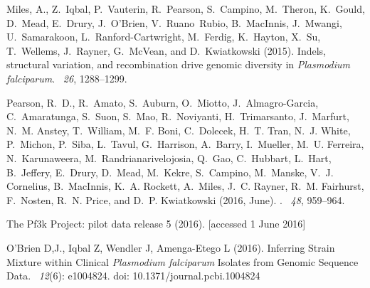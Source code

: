 \documentclass{bioinfo}
\begin{document}
\begin{thebibliography}{}
Miles, A., Z.~Iqbal, P.~Vauterin, R.~Pearson, S.~Campino, M.~Theron, K.~Gould,
  D.~Mead, E.~Drury, J.~O{\textquoteright}Brien, V.~Ruano~Rubio, B.~MacInnis,
  J.~Mwangi, U.~Samarakoon, L.~Ranford-Cartwright, M.~Ferdig, K.~Hayton, X.~Su,
  T.~Wellems, J.~Rayner, G.~McVean, and D.~Kwiatkowski (2015).
\newblock Indels, structural variation, and recombination drive genomic diversity in {\it Plasmodium falciparum}.
~{\em26\/}, 1288--1299.

Pearson, R.~D., R.~Amato, S.~Auburn, O.~Miotto, J.~Almagro-Garcia,
  C.~Amaratunga, S.~Suon, S.~Mao, R.~Noviyanti, H.~Trimarsanto, J.~Marfurt,
  N.~M. Anstey, T.~William, M.~F. Boni, C.~Dolecek, H.~T. Tran, N.~J. White,
  P.~Michon, P.~Siba, L.~Tavul, G.~Harrison, A.~Barry, I.~Mueller, M.~U.
  Ferreira, N.~Karunaweera, M.~Randrianarivelojosia, Q.~Gao, C.~Hubbart,
  L.~Hart, B.~Jeffery, E.~Drury, D.~Mead, M.~Kekre, S.~Campino, M.~Manske,
  V.~J. Cornelius, B.~MacInnis, K.~A. Rockett, A.~Miles, J.~C. Rayner, R.~M.
  Fairhurst, F.~Nosten, R.~N. Price, and D.~P. Kwiatkowski (2016, June).
.
~{\em 48}, 959--964.

The Pf3k Project: pilot data release 5 (2016).
 [accessed 1 June 2016]

O'Brien D,J., Iqbal Z, Wendler J, Amenga-Etego L (2016). \newblock Inferring Strain Mixture within Clinical {\em Plasmodium falciparum} Isolates from Genomic Sequence Data. ~{\em 12\/}(6): e1004824. doi: 10.1371/journal.pcbi.1004824



\end{thebibliography}
\end{document}
